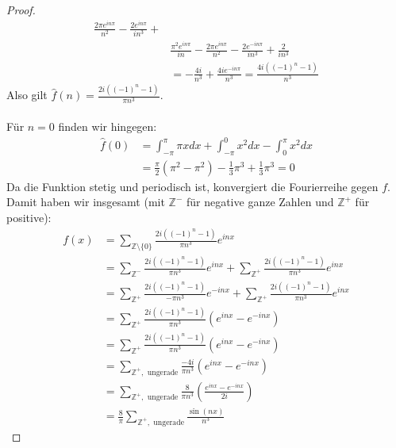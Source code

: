 \documentclass[11pt]{article}
\newcommand{\Z}{\mathbb{Z}}
\begin{document}
\begin{proof}
$$\begin{aligned}
              \frac{2\pi e^{in\pi}}{n^2}-\frac{2e^{in\pi}}{in^3} +\\&
              \frac{\pi^2 e^{in\pi}}{in}-\frac{2\pi e^{in\pi}}{n^2}-
              \frac{2e^{-in\pi}}{in^3}+\frac{2}{in^3}\\
              &=-\frac{4i}{n^3}+\frac{4 ie^{-in\pi}}{n^3} = \frac{4i((-1)^n-1)}{n^3}
        \end{aligned}$$
        Also gilt $\hat{f}(n)=\frac{2i((-1)^n-1)}{\pi n^3}$.\\\\
        Für $n=0$ finden wir hingegen:
        $$\begin{aligned}
              \hat{f}(0)&=\int^{\pi}_{-\pi} \pi x dx+\int_{-\pi}^0 x^2dx-
              \int^{\pi}_0 x^2dx\\
              &= \frac{\pi}{2}(\pi^2-\pi^2)-\frac{1}{3}\pi^3+\frac{1}{3}\pi^3 =0
        \end{aligned}$$
        Da die Funktion stetig und periodisch ist, konvergiert die Fourierreihe gegen $f$.
        Damit haben wir insgesamt (mit $\Z^-$ für negative ganze Zahlen und $\Z^+$ für positive):
        $$\begin{aligned}
              f(x)&=\sum_{\Z\setminus\{0\}}\frac{2i((-1)^n-1)}{\pi n^3}e^{inx}\\
              &= \sum_{\Z^-}\frac{2i((-1)^n-1)}{\pi n^3}e^{inx}+ \sum_{\Z^+}\frac{2i((-1)^n-1)}{\pi n^3}e^{inx}\\
              &= \sum_{\Z^+}\frac{2i((-1)^n-1)}{-\pi n^3}e^{-inx}+\sum_{\Z^+}\frac{2i((-1)^n-1)}{\pi n^3}e^{inx}\\
              &= \sum_{\Z^+}\frac{2i((-1)^n-1)}{\pi n^3}(e^{inx}-e^{-inx})\\
              &= \sum_{\Z^+}\frac{2i((-1)^n-1)}{\pi n^3}(e^{inx}-e^{-inx})\\
              &= \sum_{\Z^+, \text{ ungerade}}\frac{-4i}{\pi n^3}(e^{inx}-e^{-inx})\\
              &= \sum_{\Z^+, \text{ ungerade}}\frac{8}{\pi n^3}\left(\frac{e^{inx}-e^{-inx}}{2i}\right)\\
              &= \frac{8}{\pi}\sum_{\Z^+, \text{ ungerade}}\frac{\sin(nx)}{n^3}
        \end{aligned}$$
    \end{proof}
\end{document}
